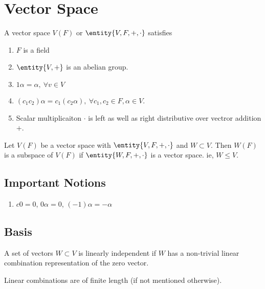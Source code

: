 \section{Vector Space}
\begin{definition}
	A vector space $V(F)$ or $\entity{V,F,+,\cdot}$ satisfies
	\begin{enumerate}
		\item $F$ is a field
		\item $\entity{V,+}$ is an abelian group.
		\item $1\alpha=\alpha,\ \forall v \in V$
		\item $(c_1c_2)\alpha = c_1 (c_2\alpha),\ \forall c_1,c_2 \in F, \alpha \in V$.
		\item Scalar multiplicaiton $\cdot$ is left as well as right distributive over vectror addition $+$.
	\end{enumerate}
\end{definition}

\begin{definition}[subspace]
	Let $V(F)$ be a vector space with $\entity{V,F,+,\cdot}$ and $W \subset V$.
	Then $W(F)$ is a subspace of $V(F)$ if $\entity{W,F,+,\cdot}$ is a vector space.
	ie, $W \le V$.
\end{definition}

\subsection*{Important Notions}
\begin{enumerate}
	\item $c0 = 0$, $0\alpha = 0$, $(-1)\alpha = -\alpha$
\end{enumerate}

\subsection{Basis}
\begin{definition}
	A set of vectors $W \subset V$ is linearly independent if $W$ has a non-trivial linear combination representation of the zero vector.
\end{definition}
\begin{note}
	Linear combinations are of finite length (if not mentioned otherwise).
\end{note}

